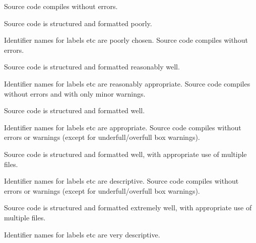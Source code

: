 \documentclass{../../../fal_assignment}
\begin{document}
\begin{markingrubric}
		\grade Source code compiles without errors.
			\par Source code is structured and formatted poorly.
			\par Identifier names for labels etc are poorly chosen.
		\grade Source code compiles without errors.
			\par Source code is structured and formatted reasonably well.
			\par Identifier names for labels etc are reasonably appropriate.
		\grade Source code compiles without errors and with only minor warnings.
			\par Source code is structured and formatted well.
			\par Identifier names for labels etc are appropriate.
		\grade Source code compiles without errors or warnings (except for underfull/overfull box warnings).
			\par Source code is structured and formatted well, with appropriate use of multiple files.
			\par Identifier names for labels etc are descriptive.
		\grade Source code compiles without errors or warnings (except for underfull/overfull box warnings).
			\par Source code is structured and formatted extremely well, with appropriate use of multiple files.
			\par Identifier names for labels etc are very descriptive.
\end{markingrubric}
\end{document}
